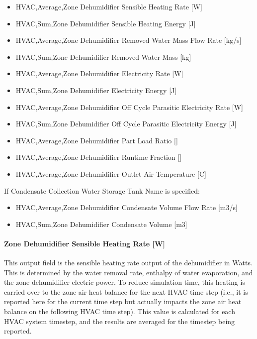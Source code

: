 \begin{itemize}
\item
  HVAC,Average,Zone Dehumidifier Sensible Heating Rate {[}W{]}
\item
  HVAC,Sum,Zone Dehumidifier Sensible Heating Energy {[}J{]}
\item
  HVAC,Average,Zone Dehumidifier Removed Water Mass Flow Rate {[}kg/s{]}
\item
  HVAC,Sum,Zone Dehumidifier Removed Water Mass {[}kg{]}
\item
  HVAC,Average,Zone Dehumidifier Electricity Rate {[}W{]}
\item
  HVAC,Sum,Zone Dehumidifier Electricity Energy {[}J{]}
\item
  HVAC,Average,Zone Dehumidifier Off Cycle Parasitic Electricity Rate {[}W{]}
\item
  HVAC,Sum,Zone Dehumidifier Off Cycle Parasitic Electricity Energy {[}J{]}
\item
  HVAC,Average,Zone Dehumidifier Part Load Ratio {[]}
\item
  HVAC,Average,Zone Dehumidifier Runtime Fraction {[]}
\item
  HVAC,Average,Zone Dehumidifier Outlet Air Temperature {[}\si{C}{]}
\end{itemize}

If Condensate Collection Water Storage Tank Name is specified:

\begin{itemize}
\item
  HVAC,Average,Zone Dehumidifier Condensate Volume Flow Rate {[}m3/s{]}
\item
  HVAC,Sum,Zone Dehumidifier Condensate Volume {[}m3{]}
\end{itemize}

\paragraph{Zone Dehumidifier Sensible Heating Rate {[}W{]}}\label{zone-dehumidifier-sensible-heating-rate-w}

This output field is the sensible heating rate output of the dehumidifier in Watts. This is determined by the water removal rate, enthalpy of water evaporation, and the zone dehumidifier electric power. To reduce simulation time, this heating is carried over to the zone air heat balance for the next HVAC time step (i.e., it is reported here for the current time step but actually impacts the zone air heat balance on the following HVAC time step). This value is calculated for each HVAC system timestep, and the results are averaged for the timestep being reported.

